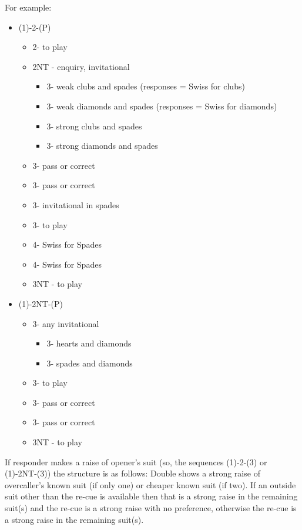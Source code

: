\documentclass[a4paper,14pt]{extarticle}
\begin{document}
\newpage

For example:

\begin{itemize}
\item (1\hearts)-2\hearts-(P)
	\begin{itemize}
	\item 2\spades - to play
	\item 2NT - enquiry, invitational
		\begin{itemize}
		\item 3\clubs - weak clubs and spades (responses = Swiss for clubs)
		\item 3\diamonds - weak diamonds and spades (responses = Swiss for diamonds)
		\item 3\hearts - strong clubs and spades
		\item 3\spades - strong diamonds and spades
		\end{itemize}
	\item 3\clubs - pass or correct
	\item 3\diamonds - pass or correct
	\item 3\hearts - invitational in spades
	\item 3\spades - to play
	\item 4\clubs - Swiss for Spades
	\item 4\diamonds - Swiss for Spades
	\item 3NT - to play
	\end{itemize}
\item (1\clubs)-2NT-(P)
	\begin{itemize}
	\item 3\clubs - any invitational
		\begin{itemize}
		\item 3\hearts - hearts and diamonds
		\item 3\spades - spades and diamonds
		\end{itemize}
	\item 3\diamonds - to play
	\item 3\hearts - pass or correct
	\item 3\spades - pass or correct
	\item 3NT - to play
	\end{itemize}
\end{itemize}

If responder makes a raise of opener's suit (so, the sequences (1\clubs)-2\clubs-(3\clubs)
or (1\hearts)-2NT-(3\clubs)) the structure is as follows: Double shows a strong raise of
overcaller's known suit (if only one) or cheaper known suit (if two). If an outside suit other than the re-cue
is available then that is a strong raise in the remaining suit(s) and the re-cue is a strong raise with no 
preference, otherwise the re-cue is a strong raise in the remaining suit(s).
\end{document}
